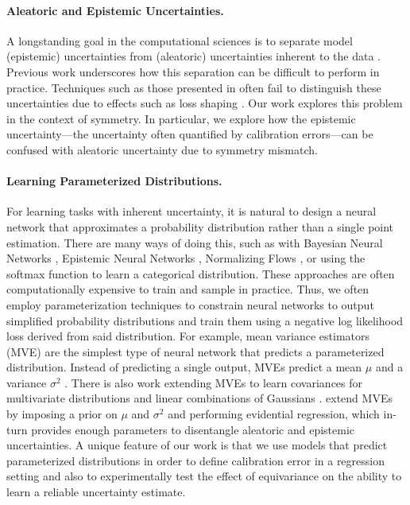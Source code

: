 \documentclass[10pt]{article} %
\theoremstyle{definition}
\begin{document}
\paragraph{Aleatoric and Epistemic Uncertainties.} A longstanding goal in the computational sciences is to separate model (epistemic) uncertainties from (aleatoric) uncertainties inherent to the data \citep{ulmer2021prior, hullermeier2021aleatoric, osband2023epistemic, fuchsgruber2024energybased, chaucredal}. Previous work underscores how this separation can be difficult to perform in practice. Techniques such as those presented in \cite{kendall2017uncertainties, amini2020deep} often fail to distinguish these uncertainties due to effects such as loss shaping \citep{ovadia2019can, valdenegro2022deeper, osband2023epistemic, wimmer2023quantifying, nevin2024deepuq, jurgens2024epistemic}. Our work explores this problem in the context of symmetry. In particular, we explore how the epistemic uncertainty---the uncertainty often quantified by calibration errors---can be confused with aleatoric uncertainty due to symmetry mismatch. 

\paragraph{Learning Parameterized Distributions.} For learning tasks with inherent uncertainty, it is natural to design a neural network that approximates a probability distribution rather than a single point estimation. There are many ways of doing this, such as with Bayesian Neural Networks \citep{kononenko1989bayesian}, Epistemic Neural Networks \citep{osband2023epistemic}, Normalizing Flows \citep{rezende2015variational, kobyzev2020normalizing, papamakarios2021normalizing}, or using the softmax function \citep{goodfellow20166} to learn a categorical distribution. These approaches are often computationally expensive to train and sample in practice. Thus, we often employ parameterization techniques to constrain neural networks to output simplified probability distributions and train them using a negative log likelihood loss derived from said distribution. For example, mean variance estimators (MVE) are the simplest type of neural network that predicts a parameterized distribution. Instead of predicting a single output, MVEs predict a mean $\mu$ and a variance $\sigma^2$ \citep{nix1994estimating, seitzer2022pitfalls}. There is also work extending MVEs to learn covariances for multivariate distributions \citep{tomczak2020efficient} and linear combinations of Gaussians \citep{diakonikolas2020robustly}. \cite{amini2020deep} extend MVEs by imposing a prior on $\mu$ and $\sigma^2$ and performing evidential regression, which in-turn provides enough parameters to disentangle aleatoric and epistemic uncertainties. A unique feature of our work is that we use models that predict parameterized distributions in order to define calibration error in a regression setting and also to experimentally test the effect of equivariance on the ability to learn a reliable uncertainty estimate. 
\end{document}
